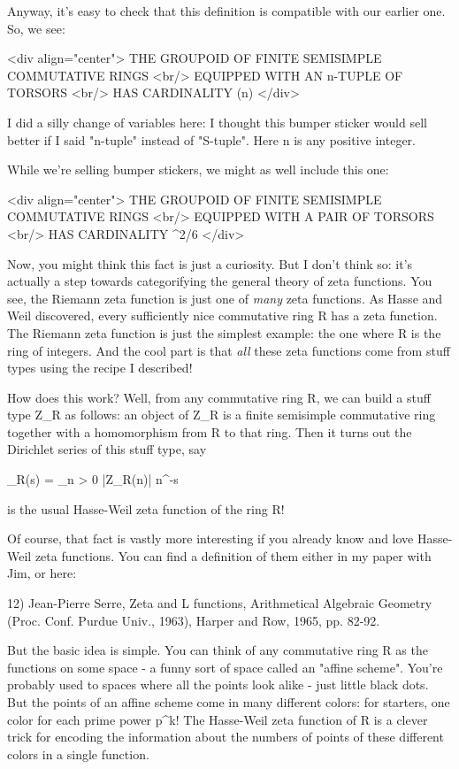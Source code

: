 Anyway, it's easy to check that this definition is compatible with our
earlier one.  So, we see:

<div align="center">
THE GROUPOID OF FINITE SEMISIMPLE COMMUTATIVE RINGS <br/>
EQUIPPED WITH AN n-TUPLE OF TORSORS <br/>
HAS CARDINALITY \zeta (n) </div>

I did a silly change of variables here: I thought this bumper sticker
would sell better if I said "n-tuple" instead of "S-tuple".  Here n is
any positive integer.

While we're selling bumper stickers, we might as well include this one:

<div align="center">
THE GROUPOID OF FINITE SEMISIMPLE COMMUTATIVE RINGS <br/>
EQUIPPED WITH A PAIR OF TORSORS <br/>
HAS CARDINALITY \pi ^{2}/6
</div>

Now, you might think this fact is just a curiosity.  But I don't think
so: it's actually a step towards categorifying the general theory of
zeta functions.  You see, the Riemann zeta function is just one of
\emph{many} zeta functions.  As Hasse and Weil discovered, every
sufficiently nice commutative ring R has a zeta function.  The Riemann
zeta function is just the simplest example: the one where R is the
ring of integers.  And the cool part is that \emph{all} these zeta
functions come from stuff types using the recipe I described!

How does this work?  Well, from any commutative ring R, we can build a
stuff type Z_{R} as follows: an object of Z_{R} is a
finite semisimple commutative ring together with a homomorphism from R
to that ring.  Then it turns out the Dirichlet series of this stuff
type, say

\zeta _{R}(s) = \sum_{n > 0} |Z_{R}(n)|
n^{-s}

is the usual Hasse-Weil zeta function of the ring R!  

Of course, that fact is vastly more interesting if you already know
and love Hasse-Weil zeta functions.  You can find a definition of them
either in my paper with Jim, or here:

12) Jean-Pierre Serre, Zeta and L functions, Arithmetical Algebraic
Geometry (Proc. Conf. Purdue Univ., 1963), Harper and Row, 1965,
pp. 82-92.


But the basic idea is simple.  You can think of any commutative ring R
as the functions on some space - a funny sort of space called an
"affine scheme".  You're probably used to spaces where all the points
look alike - just little black dots.  But the points of an affine
scheme come in many different colors: for starters, one color for 
each prime power p^{k}!  The Hasse-Weil zeta function of R
is a clever trick for encoding the information about the numbers of
points of these different colors in a single function.

